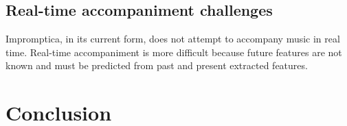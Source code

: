 \documentclass[11pt,conference,letterpaper]{IEEEtran}
\begin{document}

\subsection{Real-time accompaniment challenges}

Impromptica, in its current form, does not attempt to accompany music in real time. Real-time accompaniment is more difficult because future features are not known and must be predicted from past and present extracted features.


\section{Conclusion}



\end{document}
